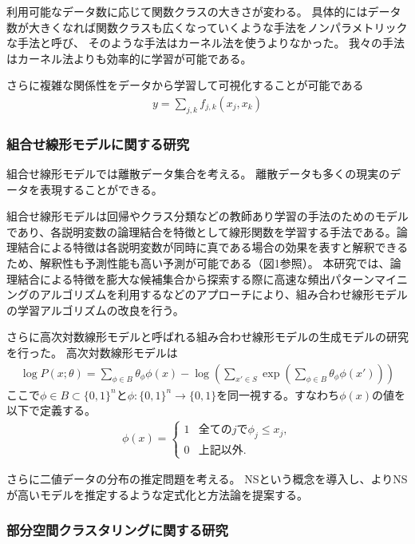 利用可能なデータ数に応じて関数クラスの大きさが変わる。
具体的にはデータ数が大きくなれば関数クラスも広くなっていくような手法をノンパラメトリックな手法と呼び、
そのような手法はカーネル法を使うよりなかった。
我々の手法はカーネル法よりも効率的に学習が可能である。


さらに複雑な関係性をデータから学習して可視化することが可能である
\begin{align*}
    y = \sum_{j,k} f_{j,k} (x_j,x_k)
\end{align*}




\subsubsection{組合せ線形モデルに関する研究}

組合せ線形モデルでは離散データ集合を考える。
離散データも多くの現実のデータを表現することができる。

組合せ線形モデルは回帰やクラス分類などの教師あり学習の手法のためのモデルであり、各説明変数の論理結合を特徴として線形関数を学習する手法である\cite{LMY01}。論理結合による特徴は各説明変数が同時に真である場合の効果を表すと解釈できるため、解釈性も予測性能も高い予測が可能である（図1参照）。
本研究では、論理結合による特徴を膨大な候補集合から探索する際に高速な頻出パターンマイニングのアルゴリズムを利用するなどのアプローチにより、組み合わせ線形モデルの学習アルゴリズムの改良を行う。

さらに高次対数線形モデルと呼ばれる組み合わせ線形モデルの生成モデルの研究を行った。
高次対数線形モデルは
\begin{align*}
    \log P(x;\theta) = \sum_{\phi\in B} \theta_\phi \phi(x)  - \log\left( \sum_{x'\in S} \exp\left( \sum_{\phi\in B} \theta_\phi \phi(x') \right) \right)    
\end{align*}
ここで$\phi \in B \subset \{0,1\}^n$と$\phi:\{0,1\}^n\to \{0,1\} $を同一視する。すなわち$\phi(x)$の値を以下で定義する。
\begin{align*}
    \phi(x)  = \begin{cases}
    1 & 全ての j で　\phi_j \le x_j, \\
    0 & 上記以外.
    \end{cases}
\end{align*}

さらに二値データの分布の推定問題を考える。
NSという概念を導入し、よりNSが高いモデルを推定するような定式化と方法論を提案する。


\subsubsection{部分空間クラスタリングに関する研究}


